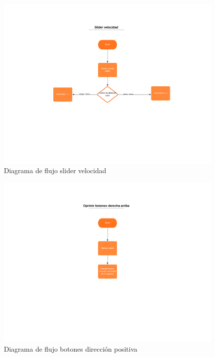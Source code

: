 \documentclass[12pt]{article} %
\begin{document}
\begin{figure}  [!htb]
  \includegraphics[width=\linewidth]{flujo1.png}
  \caption{Diagrama de flujo slider velocidad}
\end{figure}

\begin{figure}  [!htb]
  \includegraphics[width=\linewidth]{flujo2.png}
  \caption{Diagrama de flujo botones dirección positiva}
\end{figure}
\end{document}
